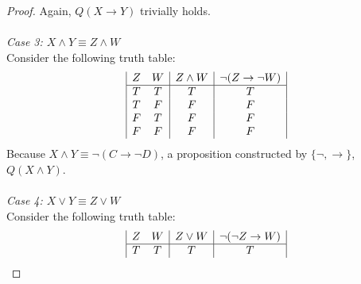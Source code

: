\documentclass[12pt]{article}
\begin{document}
\begin{proof}
    Again, $Q(X \rightarrow Y)$ trivially holds. \\
    \\
    \textit{Case 3: $X \land Y \equiv Z \land W$} \\
    Consider the following truth table: \\
        \begin{displaymath}
        \begin{array}{|c c|c|c|}  %
            Z & W & Z \land W & \neg (Z \rightarrow \neg W) \\ %
            \hline %
            T & T & T & T \\
            T & F & F & F \\
            F & T & F & F \\
            F & F & F & F \\
        \end{array}
    \end{displaymath}
    Because $X \land Y \equiv \neg(C \rightarrow \neg D)$, a proposition constructed by $\{\neg, \rightarrow\}$, $Q(X \land Y)$. \\
    \\
    \textit{Case 4: $X \lor Y \equiv Z \lor W$} \\
    Consider the following truth table: \\
        \begin{displaymath}
        \begin{array}{|c c|c|c|}  %
            Z & W & Z \lor W & \neg (\neg Z \rightarrow W) \\ %
            \hline %
            T & T & T & T \\

\end{array}
\end{displaymath}
\end{proof}
\end{document}
